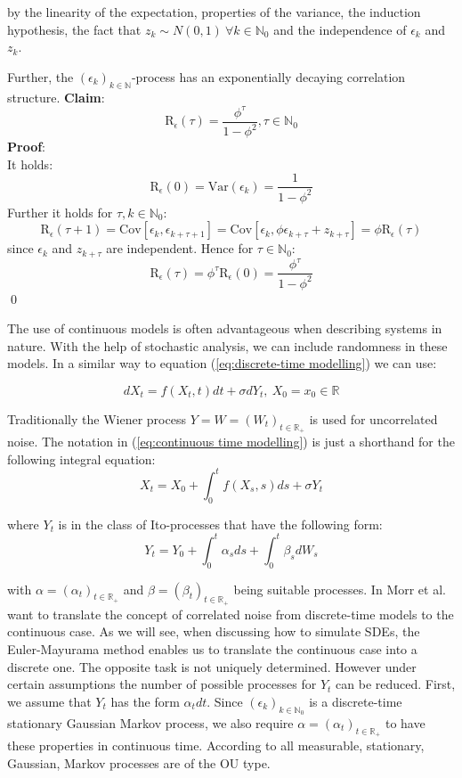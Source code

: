\documentclass[%
thesis=student,%
coverpage=false,%
titlepage=false,%
headmarks=true, %
english,%
font=libertine, %
math=newpxtx, %
BCOR=5mm,%
coverBCOR=11mm%
]{tumbook}
\begin{document}
by the linearity of the expectation, properties of the variance, the induction hypothesis, the fact that $z_{k} \sim N(0,1) \ \forall k \in \mathbb{N}_{0}$ and the independence of $\epsilon_{k}$ and $z_{k}$.

Further, the $(\epsilon_{k})_{k \in \mathbb{N}}$-process has an exponentially decaying correlation structure. \textbf{Claim}:
\[
\mathrm{R}_{\epsilon}(\tau) = \frac{\phi^{\tau}}{1-\phi^{2}}, \tau \in \mathbb{N}_{0}
\]
\textbf{Proof}: \\
It holds: 
\[
\mathrm{R}_{\epsilon}(0)= \mathrm{Var}(\epsilon_{k}) = \frac{1}{1-\phi^{2}}
\]
Further it holds for $\tau, k \in \mathbb{N}_{0}$:
\[
\mathrm{R}_{\epsilon}(\tau+1) = \mathrm{Cov}[\epsilon_{k},\epsilon_{k+\tau + 1}] = \mathrm{Cov}[\epsilon_{k},\phi\epsilon_{k+\tau}+z_{k+\tau}] = \phi \mathrm{R}_{\epsilon}(\tau)
\]
since $\epsilon_{k}$ and $z_{k+\tau}$ are independent. Hence for $\tau \in \mathbb{N}_{0}$:
\[
\mathrm{R}_{\epsilon}(\tau) = \phi^{\tau}\mathrm{R}_{\epsilon}(0)=\frac{\phi^{\tau}}{1-\phi^{2}}
\]
\qed

The use of continuous models is often advantageous when describing systems in nature. With the help of stochastic analysis, we can include randomness in these models. In a similar way to equation (\ref{eq:discrete-time modelling}) we can use: 

\begin{equation}
    dX_{t} = f(X_{t},t)dt + \sigma dY_{t}, \ X_{0} = x_{0} \in \mathbb{R}
    \label{eq:continuous time modelling}
\end{equation}

Traditionally the Wiener process $Y = W = (W_{t})_{t\in \mathbb{R}_{+}}$ is used for uncorrelated noise. The notation in (\ref{eq:continuous time modelling}) is just a shorthand for the following integral equation:
\[
X_{t} = X_{0} + \int_{0}^{t}f(X_{s},s)ds + \sigma Y_{t}
\]

where $Y_{t}$ is in the class of Ito-processes that have the following form:
\begin{equation}
    Y_{t} = Y_{0} + \int_{0}^{t}\alpha_{s}ds + \int_{0}^{t}\beta_{s}dW_{s}
    \label{eq:Ito process}
\end{equation}

with $\alpha = (\alpha_{t})_{t\in\mathbb{R}_{+}}$ and $\beta = (\beta_{t})_{t\in\mathbb{R}_{+}}$ being suitable processes.
In \cite{Morr:2022} Morr et al. want to translate the concept of correlated noise from discrete-time models to the continuous case. As we will see, when discussing how to simulate SDEs, the Euler-Mayurama method enables us to translate the continuous case into a discrete one. The opposite task is not uniquely determined. However under certain assumptions the number of possible processes for $Y_{t}$ can be reduced. First, we assume that $Y_{t}$ has the form $\alpha_{t}dt$. Since $(\epsilon_{k})_{k\in\mathbb{N}_{0}}$ is a discrete-time stationary Gaussian Markov process, we also require $\alpha = (\alpha_{t})_{t\in\mathbb{R}_{+}}$ to have these properties in continuous time. According to \cite{doob:1942} all measurable, stationary, Gaussian, Markov processes are of the OU type. 
\end{document}
